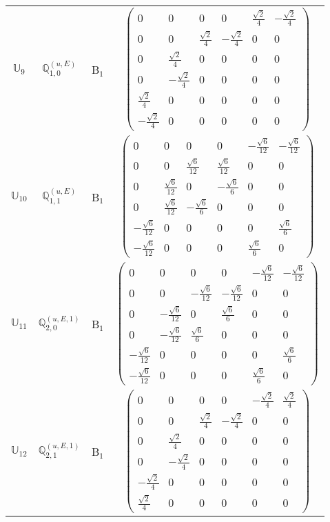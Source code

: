 \documentclass[fleqn,10pt,landscape]{article}
\begin{document}
\begin{itemize}
\begin{center}
\begin{longtable}{c|c|c|c}
$ \mathbb{U}_{9} $ & $\mathbb{Q}_{1,0}^{(u,E)}$ & B$_{1}$ & $\begin{pmatrix} 0 & 0 & 0 & 0 & \frac{\sqrt{2}}{4} & - \frac{\sqrt{2}}{4} \\ 0 & 0 & \frac{\sqrt{2}}{4} & - \frac{\sqrt{2}}{4} & 0 & 0 \\ 0 & \frac{\sqrt{2}}{4} & 0 & 0 & 0 & 0 \\ 0 & - \frac{\sqrt{2}}{4} & 0 & 0 & 0 & 0 \\ \frac{\sqrt{2}}{4} & 0 & 0 & 0 & 0 & 0 \\ - \frac{\sqrt{2}}{4} & 0 & 0 & 0 & 0 & 0 \end{pmatrix}$ \\
$ \mathbb{U}_{10} $ & $\mathbb{Q}_{1,1}^{(u,E)}$ & B$_{1}$ & $\begin{pmatrix} 0 & 0 & 0 & 0 & - \frac{\sqrt{6}}{12} & - \frac{\sqrt{6}}{12} \\ 0 & 0 & \frac{\sqrt{6}}{12} & \frac{\sqrt{6}}{12} & 0 & 0 \\ 0 & \frac{\sqrt{6}}{12} & 0 & - \frac{\sqrt{6}}{6} & 0 & 0 \\ 0 & \frac{\sqrt{6}}{12} & - \frac{\sqrt{6}}{6} & 0 & 0 & 0 \\ - \frac{\sqrt{6}}{12} & 0 & 0 & 0 & 0 & \frac{\sqrt{6}}{6} \\ - \frac{\sqrt{6}}{12} & 0 & 0 & 0 & \frac{\sqrt{6}}{6} & 0 \end{pmatrix}$ \\
$ \mathbb{U}_{11} $ & $\mathbb{Q}_{2,0}^{(u,E,1)}$ & B$_{1}$ & $\begin{pmatrix} 0 & 0 & 0 & 0 & - \frac{\sqrt{6}}{12} & - \frac{\sqrt{6}}{12} \\ 0 & 0 & - \frac{\sqrt{6}}{12} & - \frac{\sqrt{6}}{12} & 0 & 0 \\ 0 & - \frac{\sqrt{6}}{12} & 0 & \frac{\sqrt{6}}{6} & 0 & 0 \\ 0 & - \frac{\sqrt{6}}{12} & \frac{\sqrt{6}}{6} & 0 & 0 & 0 \\ - \frac{\sqrt{6}}{12} & 0 & 0 & 0 & 0 & \frac{\sqrt{6}}{6} \\ - \frac{\sqrt{6}}{12} & 0 & 0 & 0 & \frac{\sqrt{6}}{6} & 0 \end{pmatrix}$ \\
$ \mathbb{U}_{12} $ & $\mathbb{Q}_{2,1}^{(u,E,1)}$ & B$_{1}$ & $\begin{pmatrix} 0 & 0 & 0 & 0 & - \frac{\sqrt{2}}{4} & \frac{\sqrt{2}}{4} \\ 0 & 0 & \frac{\sqrt{2}}{4} & - \frac{\sqrt{2}}{4} & 0 & 0 \\ 0 & \frac{\sqrt{2}}{4} & 0 & 0 & 0 & 0 \\ 0 & - \frac{\sqrt{2}}{4} & 0 & 0 & 0 & 0 \\ - \frac{\sqrt{2}}{4} & 0 & 0 & 0 & 0 & 0 \\ \frac{\sqrt{2}}{4} & 0 & 0 & 0 & 0 & 0 \end{pmatrix}$ \\

\end{longtable}
\end{center}
\end{itemize}
\end{document}
